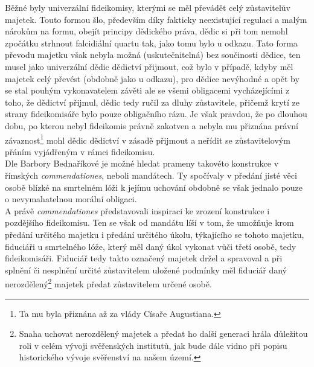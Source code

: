 \documentclass{article}
\begin{document}
Běžné byly univerzální fideikomisy, kterými se měl převádět celý zůstavitelův majetek. Touto formou šlo, především díky fakticky neexistující regulaci a malým nárokům na formu, obejít principy dědického práva, dědic si při tom nemohl zpočátku strhnout falcidiální quartu tak, jako tomu bylo u odkazu. Tato forma převodu majetku však nebyla možná (uskutečnitelná) bez součinosti dědice, ten musel jako univerzální dědic dědictví přijmout, což bylo v případě, kdyby měl majetek celý převést (obdobně jako u odkazu), pro dědice nevýhodné a opět by se stal pouhým vykonavatelem závěti ale se všemi obligacemi vycháze\-jícími z toho, že dědictví přijmul, dědic tedy ručil za dluhy zůstavitele, přičemž krytí ze strany fideikomisáře bylo pouze obligačního rázu. Je však pravdou, že po dlouhou dobu, po kterou nebyl fideikomis právně zakotven a nebyla mu přiznána právní závaznost\footnote{Ta mu byla přiznána až za vlády Císaře Augustiana.} mohl dědic dědictví v zásadě přijmout a neřídit se zůstavitelovým přáním vyjádřeným v rámci fideikomisu.\\


Dle Barbory Bednaříkové je možné hledat prameny takovéto konstrukce v římských \textit{commendationes}, neboli mandátech. Ty spočívaly v předání jisté věci osobě blízké na smrtelném lóži k jejímu uchování obdobně se však jednalo pouze o nevymahatelnou morální obligaci.\\


A právě \textit{commendationes} představovali inspiraci ke zrození konstrukce i pozdějšího fideikomisu. Ten se však od mandátu líší v tom, že umožňuje krom předání určitého majetku i předání určitého úkolu, týkajícího se tohoto majetku, fiduciáři u smrtelného lóže, který měl daný úkol vykonat vůči třetí osobě, tedy fideikomisáři. Fiduciář tedy takto označený majetek držel a spravoval a při splnění či nesplnění určité zůstavitelem uložené podmínky měl fiduciář daný nerozdělený\footnote{Snaha uchovat nerozdělený majetek a předat ho další generaci hrála důležitou roli v celém vývoji svěřenských institutů, jak bude dále vidno při popisu historického vývoje svěřenství na našem území.} majetek předat zůstavitelem určené osobě.\\
\end{document}
